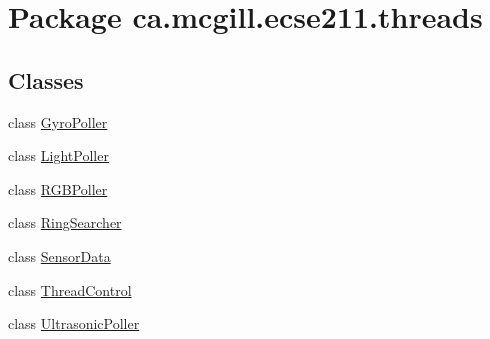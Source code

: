 \hypertarget{namespaceca_1_1mcgill_1_1ecse211_1_1threads}{}\section{Package ca.\+mcgill.\+ecse211.\+threads}
\label{namespaceca_1_1mcgill_1_1ecse211_1_1threads}
\subsection*{Classes}
\begin{DoxyCompactItemize}
\item 
class \hyperlink{classca_1_1mcgill_1_1ecse211_1_1threads_1_1_gyro_poller}{Gyro\+Poller}
\item 
class \hyperlink{classca_1_1mcgill_1_1ecse211_1_1threads_1_1_light_poller}{Light\+Poller}
\item 
class \hyperlink{classca_1_1mcgill_1_1ecse211_1_1threads_1_1_r_g_b_poller}{R\+G\+B\+Poller}
\item 
class \hyperlink{classca_1_1mcgill_1_1ecse211_1_1threads_1_1_ring_searcher}{Ring\+Searcher}
\item 
class \hyperlink{classca_1_1mcgill_1_1ecse211_1_1threads_1_1_sensor_data}{Sensor\+Data}
\item 
class \hyperlink{classca_1_1mcgill_1_1ecse211_1_1threads_1_1_thread_control}{Thread\+Control}
\item 
class \hyperlink{classca_1_1mcgill_1_1ecse211_1_1threads_1_1_ultrasonic_poller}{Ultrasonic\+Poller}
\end{DoxyCompactItemize}
